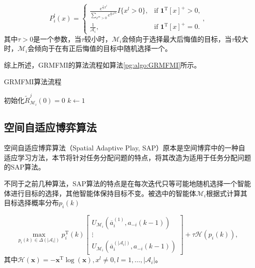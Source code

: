 \begin{equation}
	P_i^l(x) = 	
	\begin{cases}
		\frac{e^{\frac{1}{\tau} x^l}}{\sum_{x^m>0}e^{\frac{1}{\tau}x^m}} I\{x^l>0\}, & \text{if ${\bm 1}^{\mathrm T}[x]^+>0$,}\\
		\frac{1}{\mathcal{A}_i}, & \text{if ${\bm{1}}^{\mathrm T}[x]^+=0$.}
	\end{cases},
\end{equation}
其中$\tau>0$是一个参数，当$\tau$较小时，$\mathcal{M}_i$会倾向于选择最大后悔值的目标，当$\tau$较大时，$\mathcal{M}_i$会倾向于在有正后悔值的目标中随机选择一个。

综上所述，GRMFMI的算法流程如算法\ref{pg:algo:GRMFMI}所示。

\begin{algorithm}[htb]
	\caption{GRMFMI算法流程}
	\label{pg:algo:GRMFMI}
	\small
	\SetAlgoLined
	
	初始化$\widetilde R_{\mathcal{M}_i}^j(0)=0$\;
	$k \gets 1$\;
\end{algorithm}


\subsection{空间自适应博弈算法}

空间自适应博弈算法（Spatial Adaptive Play, SAP）原本是空间博弈中的一种自适应学习方法，本节将针对任务分配问题的特点，将其改造为适用于任务分配问题的SAP算法。

不同于之前几种算法，SAP算法的特点是在每次迭代只等可能地随机选择一个智能体进行目标的选择，其他智能体保持目标不变。被选中的智能体$\mathcal{M}_i$根据式计算其目标选择概率分布$p_i(k)$

\begin{equation}
\label{pg:eq:MaxEntropy}
	\max_{p_i(k) \in \Delta(|\mathcal{A}_i|)} p_i^{\mathrm T}(k) \begin{bmatrix}
		U_{\mathcal{M}_i}(\overline a_i^{(1)},a_{-i}(k-1))\\ \vdots \\ U_{\mathcal{M}_i}(\overline a_i^{(|\mathcal{A}_i|)},a_{-i}(k-1))
	\end{bmatrix}
	+ \tau \mathcal{H}(p_i(k)),
\end{equation}
其中$\mathcal{H}({\bm x}) = -{\bm x}^{\mathrm T} \log({\bm x}), x^l \neq 0,l=1,\dots,|\mathcal{A}_i|$。

